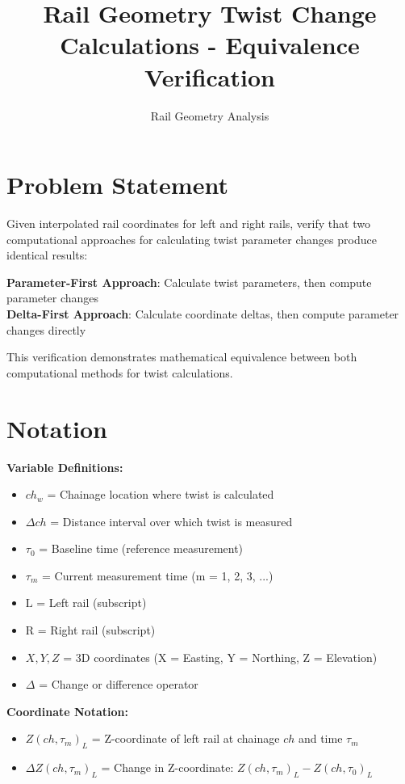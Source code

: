 \documentclass{article}
\title{Rail Geometry Twist Change Calculations - Equivalence Verification}
\author{Rail Geometry Analysis}
\date{}
\begin{document}
\maketitle

\section{Problem Statement}
Given interpolated rail coordinates for left and right rails, verify that two computational approaches for calculating twist parameter changes produce identical results:

\textbf{Parameter-First Approach}: Calculate twist parameters, then compute parameter changes\\
\textbf{Delta-First Approach}: Calculate coordinate deltas, then compute parameter changes directly

This verification demonstrates mathematical equivalence between both computational methods for twist calculations.

\section{Notation}
\textbf{Variable Definitions:}
\begin{itemize}
\item $ch_w$ = Chainage location where twist is calculated
\item $\Delta ch$ = Distance interval over which twist is measured
\item $\tau_0$ = Baseline time (reference measurement)
\item $\tau_m$ = Current measurement time (m = 1, 2, 3, ...)
\item $\text{L}$ = Left rail (subscript)
\item $\text{R}$ = Right rail (subscript)
\item $X, Y, Z$ = 3D coordinates (X = Easting, Y = Northing, Z = Elevation)
\item $\Delta$ = Change or difference operator
\end{itemize}

\textbf{Coordinate Notation:}
\begin{itemize}
\item $Z(ch, \tau_m)_L$ = Z-coordinate of left rail at chainage $ch$ and time $\tau_m$
\item $\Delta Z(ch, \tau_m)_L$ = Change in Z-coordinate: $Z(ch, \tau_m)_L - Z(ch, \tau_0)_L$
\end{itemize}
\end{document}
